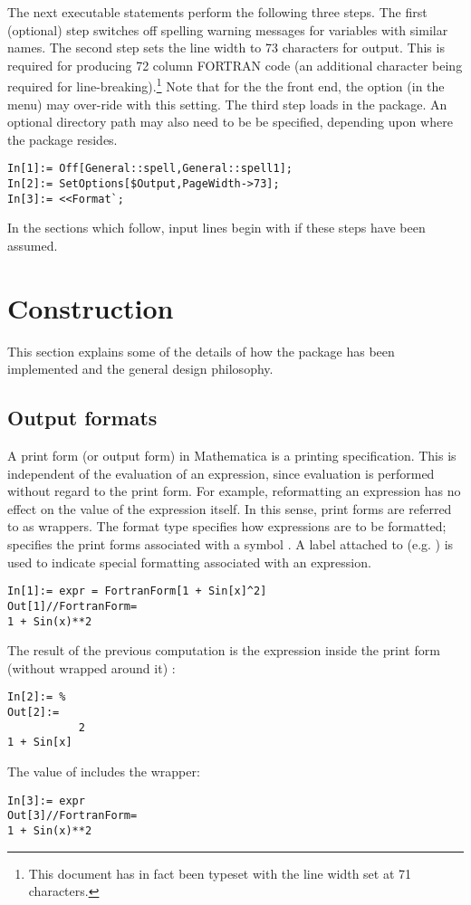 \documentclass [12pt,twoside]{article}
\begin{document}
The next executable statements perform the following three steps.
The first (optional) step switches off spelling warning messages for
variables with similar names. The second step sets the line width to 73
characters for output. This is required for producing 72
column FORTRAN code (an additional character being required for
line-breaking).\footnote{This document has in fact been typeset with the
line width set at 71 characters.} Note that for the the  front end, the option
 (in the  menu)
may over-ride with this setting. The third step loads in the package. An optional
directory path may also need to be be specified, depending upon where the package
resides.
\begin{verbatim}
In[1]:= Off[General::spell,General::spell1];
In[2]:= SetOptions[$Output,PageWidth->73];
In[3]:= <<Format`;
\end{verbatim}
In the sections which follow, input lines begin with  if these steps
have been assumed.

\pagebreak[2]

\section{Construction}
This section explains some of the details of how the package has been implemented
and the general design philosophy.

\subsection{Output formats}\label{opf}
A print form (or output form) in Mathematica is a printing specification.
This is independent of the evaluation of an expression, since evaluation is performed
without regard to the print form. For example, reformatting an
expression has no effect on the value of the expression itself. In this
sense, print forms are referred to as wrappers. The format type
specifies how expressions are to be formatted; 
specifies the print forms associated with a symbol . A label
attached to  (e.g. ) is used to indicate
special formatting associated with an expression.
\begin{verbatim}
In[1]:= expr = FortranForm[1 + Sin[x]^2]
Out[1]//FortranForm=
1 + Sin(x)**2
\end{verbatim}
The result of the previous computation is the expression inside the
print form (without  wrapped around it) :
\begin{verbatim}
In[2]:= %
Out[2]:=
           2
1 + Sin[x]
\end{verbatim}
The value of  includes the wrapper:
\begin{verbatim}
In[3]:= expr
Out[3]//FortranForm=
1 + Sin(x)**2
\end{verbatim}
\end{document}
